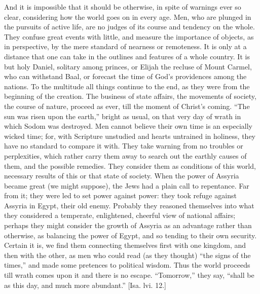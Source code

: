 And it is impossible that it should be otherwise, in spite of
warnings ever so clear, considering how the world goes on in every age.
Men, who are plunged in the pursuits of active life, are no judges of
its course and tendency on the whole. They confuse great events with
little, and measure the importance of objects, as in perspective, by the
mere standard of nearness or remoteness. It is only at a distance that
one can take in the outlines and features of a whole country. It is but
holy Daniel, solitary among princes, or Elijah the recluse of Mount
Carmel, who can withstand Baal, or forecast the time of God's
providences among the nations. To the multitude all things continue to
the end, as they were from the beginning of the creation. The business
of state affairs, the movements of society, the course of nature,
proceed as ever, till the moment of Christ's coming. ``The sun was
risen upon the earth,'' bright as usual, on that very day of wrath
in which Sodom was destroyed. Men cannot believe their own time is an
especially wicked time; for, with Scripture unstudied and hearts
untrained in holiness, they have no standard to compare it with. They
take warning from no troubles or perplexities, which rather carry them
away to search out the earthly causes of them, and the possible
remedies. They consider them as conditions of this world, necessary
results of this or that state of society. When the power of Assyria
became great (we might suppose), the Jews had a plain call to
repentance. Far from it; they were led to set power against power: they
took refuge against Assyria in Egypt, their old enemy. Probably they
reasoned themselves into what they considered a temperate, enlightened,
cheerful view of national affairs; perhaps they might consider the
growth of Assyria as an advantage rather than otherwise, as balancing
the power of Egypt, and so tending to their own security. Certain it is,
we find them connecting themselves first with one kingdom, and then with
the other, as men who could read (as they thought) ``the signs of
the times,'' and made some pretences to political wisdom. Thus the
world proceeds till wrath comes upon it and there is no escape.
``Tomorrow,'' they say, ``shall be as this day, and much
more abundant.'' [Isa. lvi. 12.]

